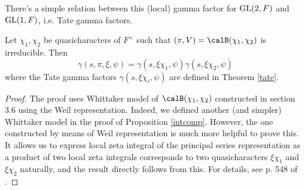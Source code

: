 There's a simple relation between this (local) gamma factor for  $\mathrm{GL}(2, F)$ and $\mathrm{GL}(1, F)$, i.e. Tate gamma factors.
\begin{theorem}
Let $\chi_1, \chi_2$ be quasicharacters of $F^{\times}$ such that $(\pi, V) = \calB(\chi_1, \chi_2)$ is irreducible. Then 
$$
\gamma(s, \pi, \xi, \psi) = \gamma(s, \xi\chi_1, \psi)\gamma(s, \xi\chi_2, \psi)
$$
where the Tate gamma factors $\gamma(s, \xi\chi_i, \psi)$ are defined in Theorem \ref{tate}. 
\end{theorem}
\begin{proof}
The proof uses Whittaker model of $\calB(\chi_1, \chi_2)$ constructed in section 3.6 using the Weil representation. 
Indeed, we defined another (and simpler) Whittaker model in the proof of Proposition \ref{intcomp}. 
However, the one constructed by means of Weil representation is much more helpful to prove this. 
It allows us to express local zeta integral of the principal series representation as a product of two local zeta integrals corresponds to two quasicharacters $\xi\chi_1$ and $\xi\chi_2$ naturally, and the result directly follows from this. For details, see p. 548 of \cite{bu}.
\end{proof}
